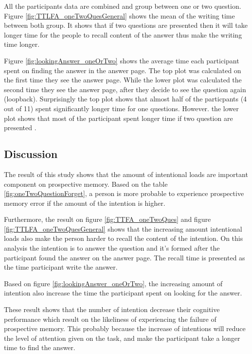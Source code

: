 All the participants data are combined and group between one or two question. Figure \ref{fig:TTLFA_oneTwoQuesGeneral} shows the mean of the writing time between both group.
It shows that if two questions are presented then it will take longer time for the people to recall content of the answer thus make the writing time longer.

Figure \ref{fig:lookingAnswer_oneOrTwo} shows the average time each participant spent on finding the answer in the answer page.
 The top plot was calculated on the first time they see the answer page.
 While the lower plot was calculated the second time they see the answer page, after they decide to see the question again (loopback).
Surprisingly the top plot shows that almost half of the particpants (4 out of 11) spent significantly longer time for one questions.
However. the lower plot shows that most of the participant spent longer time if two question are presented .

\subsection{Discussion}

The result of this study shows that the amount of intentional loads are important component on prospective memory. Based on the table \ref{fig:oneTwoQuestionForget}, a person is more probable to experience
prospective memory error if the amount of the intention is higher.

Furthermore, the result on figure \ref{fig:TTFA_oneTwoQues} and figure \ref{fig:TTLFA_oneTwoQuesGeneral} shows that the increasing amount intentional loads also make the person harder to recall the content of the intention.
On this analysis the intention is to answer the question and it's formed after the participant found the answer on the answer page.
The recall time is presented as the time participant write the answer.

Based on figure \ref{fig:lookingAnswer_oneOrTwo}, the increasing amount of intention also increase the time
the participant spent on looking for the answer.


These result shows that the number of intention decrease their cognitive performance which result on the likeliness of experiencing the failure of prospective memory.
This probably because the increase of intentions will reduce the level of attention given on the task, and make
the participant take a longer time to find the answer.


